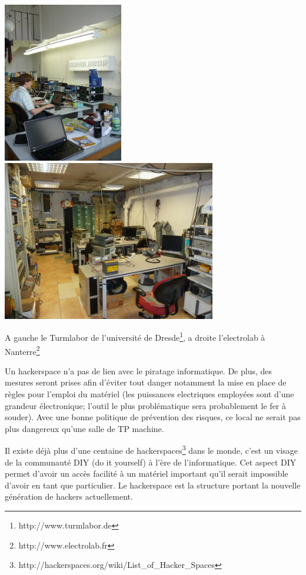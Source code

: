 \documentclass{article}
\begin{document}
\begin{center}
\includegraphics[height=70mm]{turmlabor.jpg}
\includegraphics[height=70mm]{electrolab.jpg}

A gauche le Turmlabor de l'université de Dresde\footnote{http://www.turmlabor.de}, a droite l'electrolab à Nanterre\footnote{http://www.electrolab.fr}
\end{center}

Un hackerspace n'a pas de lien avec le piratage informatique.
De plus, des mesures seront prises afin d'éviter tout danger notamment la mise en place de règles pour l'emploi du matériel (les puissances electriques employées sont d'une grandeur électronique; l'outil le plus problématique sera probablement le fer à souder). Avec une bonne politique de prévention des risques, ce local ne serait pas plus dangereux qu'une salle de TP machine.

Il existe déjà plus d'une centaine de hackerspaces\footnote{http://hackerspaces.org/wiki/List\_of\_Hacker\_Spaces} dans le monde, c'est un visage de la communauté DIY (do it yourself) à l'ère de
l'informatique. Cet aspect DIY permet d'avoir un accès facilité à un
matériel important qu'il serait impossible d'avoir en tant que
particulier. Le hackerspace est la structure portant la nouvelle génération de hackers actuellement.
\end{document}
